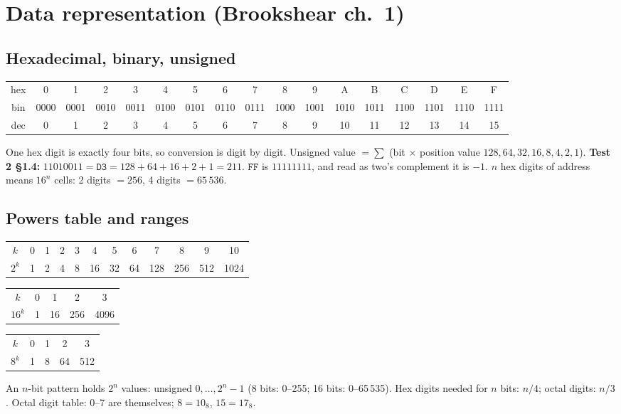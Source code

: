 \documentclass{fkt-notes}
\newcommand{\hx}[1]{\texttt{#1}}
\begin{document}
\tableofcontents

\newpage
\section{Data representation (Brookshear ch.~1)}

\subsection{Hexadecimal, binary, unsigned}
\begin{center}
  \footnotesize\setlength{\tabcolsep}{3pt}\renewcommand{\arraystretch}{1.1}
  \begin{tabular}{@{}c|cccccccccccccccc@{}}
    hex & 0    & 1    & 2    & 3    & 4    & 5    & 6    & 7    & 8    & 9    & A    & B    & C    & D    & E    & F    \\
    bin & 0000 & 0001 & 0010 & 0011 & 0100 & 0101 & 0110 & 0111 & 1000 & 1001 & 1010 & 1011 & 1100 & 1101 & 1110 & 1111 \\
    dec & 0    & 1    & 2    & 3    & 4    & 5    & 6    & 7    & 8    & 9    & 10   & 11   & 12   & 13   & 14   & 15   \\
  \end{tabular}
\end{center}
One hex digit is exactly four bits, so conversion is digit by digit.
Unsigned value $=\sum$ (bit $\times$ position value $128,64,32,16,8,4,2,1$).
\textbf{Test 2 \S1.4:} $11010011=\hx{D3}=128+64+16+2+1=211$. $\hx{FF}$ is
$11111111$, and read as two's complement it is $-1$.
$n$ hex digits of address means $16^n$ cells: 2 digits $=256$, 4 digits $=65\,536$.

\subsection{Powers table and ranges}
\begin{center}
  \small\setlength{\tabcolsep}{4pt}
  \begin{tabular}{@{}c|ccccccccccc@{}}
    $k$   & 0 & 1 & 2 & 3 & 4 & 5  & 6  & 7   & 8   & 9   & 10   \\
    $2^k$ & 1 & 2 & 4 & 8 & 16 & 32 & 64 & 128 & 256 & 512 & 1024 \\
  \end{tabular}
  \qquad
  \begin{tabular}{@{}c|cccc@{}}
    $k$    & 0 & 1  & 2   & 3    \\
    $16^k$ & 1 & 16 & 256 & 4096 \\
  \end{tabular}
  \qquad
  \begin{tabular}{@{}c|cccc@{}}
    $k$   & 0 & 1 & 2  & 3   \\
    $8^k$ & 1 & 8 & 64 & 512 \\
  \end{tabular}
\end{center}
An $n$-bit pattern holds $2^n$ values: unsigned $0,\dots,2^n-1$ (8 bits: 0--255;
16 bits: 0--65\,535). Hex digits needed for $n$ bits: $n/4$; octal digits: $n/3$.
Octal digit table: $0$--$7$ are themselves; $8=10_8$, $15=17_8$.
\end{document}
